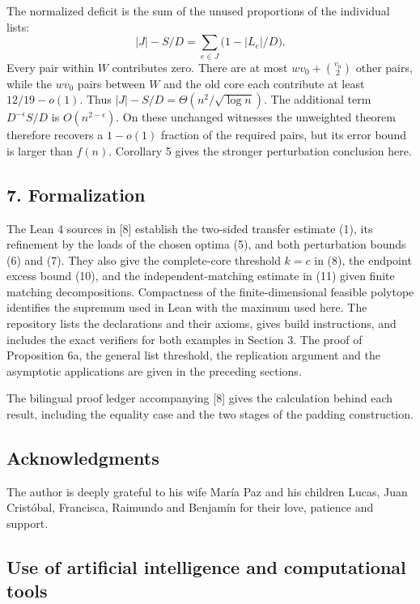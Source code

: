 \documentclass[english,11pt,a4paper]{article}
\begin{document}
The normalized deficit is the sum of the unused proportions of the individual lists: \[
|J|-S/D=\sum_{e\in J}\bigl(1-|L_e|/D\bigr).
\] Every pair within \(W\) contributes zero. There are at most \(wv_0+\binom{v_0}{2}\) other pairs, while the \(wv_0\) pairs between \(W\) and the old core each contribute at least \(12/19-o(1)\). Thus \(|J|-S/D=\Theta(n^2/\sqrt{\log n})\). The additional term \(D^{-\epsilon}S/D\) is \(O(n^{2-\epsilon})\). On these unchanged witnesses the unweighted theorem therefore recovers a \(1-o(1)\) fraction of the required pairs, but its error bound is larger than \(f(n)\). Corollary 5 gives the stronger perturbation conclusion here.

\subsection{7. Formalization}\label{formalization}

The Lean 4 sources in {[}8{]} establish the two-sided transfer estimate (1), its refinement by the loads of the chosen optima (5), and both perturbation bounds (6) and (7). They also give the complete-core threshold \(k=c\) in (8), the endpoint excess bound (10), and the independent-matching estimate in (11) given finite matching decompositions. Compactness of the finite-dimensional feasible polytope identifies the supremum used in Lean with the maximum used here. The repository lists the declarations and their axioms, gives build instructions, and includes the exact verifiers for both examples in Section 3. The proof of Proposition 6a, the general list threshold, the replication argument and the asymptotic applications are given in the preceding sections.

The bilingual proof ledger accompanying {[}8{]} gives the calculation behind each result, including the equality case and the two stages of the padding construction.

\subsection{Acknowledgments}\label{acknowledgments}

The author is deeply grateful to his wife María Paz and his children Lucas, Juan Cristóbal, Francisca, Raimundo and Benjamín for their love, patience and support.

\subsection{Use of artificial intelligence and computational tools}\label{use-of-artificial-intelligence-and-computational-tools}
\end{document}

